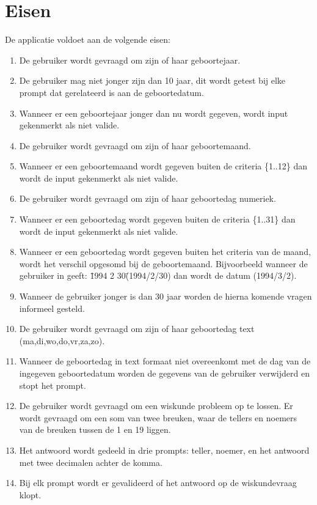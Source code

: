 \documentclass[10pt]{article}
\begin{document}
\section{Eisen}
De applicatie voldoet aan de volgende eisen:
\begin{enumerate}
      \item De gebruiker wordt gevraagd om zijn of haar geboortejaar.
      \item De gebruiker mag niet jonger zijn dan 10 jaar, dit wordt getest bij elke prompt dat gerelateerd is aan de
            geboortedatum.
      \item Wanneer er een geboortejaar jonger dan nu wordt gegeven, wordt input gekenmerkt als niet valide.
      \item De gebruiker wordt gevraagd om zijn of haar geboortemaand.
      \item Wanneer er een geboortemaand wordt gegeven buiten de criteria \{1..12\} dan wordt de input gekenmerkt als
            niet
            valide.
      \item De gebruiker wordt gevraagd om zijn of haar geboortedag numeriek.
      \item Wanneer er een geboortedag wordt gegeven buiten de criteria \{1..31\} dan wordt de input gekenmerkt als
            niet
            valide.
      \item Wanneer er een geboortedag wordt gegeven buiten het criteria van de maand, wordt het verschil opgesomd bij
            de
            geboortemaand. Bijvoorbeeld wanneer de gebruiker in geeft: \"1994 2 30\" (1994/2/30) dan wordt de datum
            (1994/3/2).
      \item Wanneer de gebruiker jonger is dan 30 jaar worden de hierna komende vragen informeel gesteld.
      \item De gebruiker wordt gevraagd om zijn of haar geboortedag text (ma,di,wo,do,vr,za,zo).
      \item Wanneer de geboortedag in text formaat niet overeenkomt met de dag van de ingegeven geboortedatum worden de
            gegevens van de gebruiker verwijderd en stopt het prompt.
      \item De gebruiker wordt gevraagd om een wiskunde probleem op te lossen. Er wordt gevraagd om een
            som van twee breuken, waar de tellers en noemers van de breuken tussen de 1 en 19 liggen.\
      \item Het antwoord wordt gedeeld in drie prompts: teller, noemer, en het antwoord met twee decimalen achter de
            komma.
      \item Bij elk prompt wordt er gevalideerd of het antwoord op de wiskundevraag klopt.

\end{enumerate}
\end{document}
